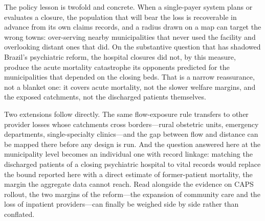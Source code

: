The policy lesson is twofold and concrete. When a single-payer system
plans or evaluates a closure, the population that will bear the loss is
recoverable in advance from its own claims records, and a radius drawn on
a map can target the wrong towns: over-serving nearby municipalities that
never used the facility and overlooking distant ones that did. On the
substantive question that has shadowed Brazil's psychiatric reform, the
hospital closures did not, by this measure, produce the acute
mortality catastrophe its opponents predicted for the municipalities that
depended on the closing beds. That is a narrow reassurance, not a blanket
one: it covers acute mortality, not the slower welfare margins, and the
exposed catchments, not the discharged patients themselves.

Two extensions follow directly. The same flow-exposure rule transfers to
other provider losses whose catchments cross borders---rural obstetric
units, emergency departments, single-specialty clinics---and the gap
between flow and distance can be mapped there before any design is run.
And the question answered here at the municipality level becomes an
individual one with record linkage: matching the discharged patients of a
closing psychiatric hospital to vital records would replace the bound
reported here with a direct estimate of former-patient mortality, the
margin the aggregate data cannot reach. Read alongside the evidence on
CAPS rollout, the two margins of the reform---the expansion of community
care and the loss of inpatient providers---can finally be weighed side by
side rather than conflated.
